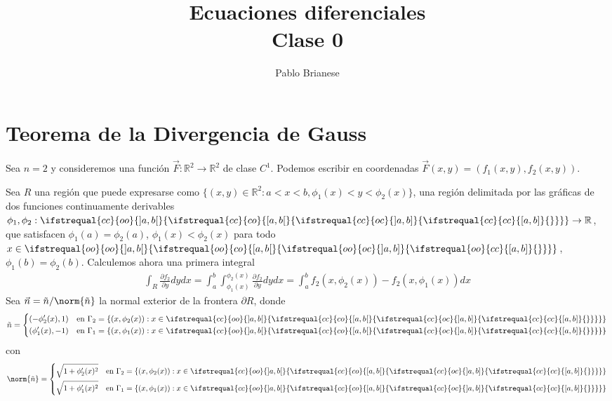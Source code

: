 \documentclass{report}
\title{Ecuaciones diferenciales \\ Clase 0}
\author{Pablo Brianese}
\newcommand{\realNumbers}{\mathbb{R}}
\theoremstyle{definition}
\theoremstyle{remark}
\newcommand{\leftOpenInterval}{\left]}
\newcommand{\rightOpenInterval}{\right[}
\newcommand{\leftClosedInterval}{\left[}
\newcommand{\rightClosedInterval}{\right]}
\newcommand{\interval}[3]{%
  \ifstrequal{#1}{oo}{%
    \leftOpenInterval #2, #3 \rightOpenInterval%
  }{%
    \ifstrequal{#1}{co}{%
      \leftClosedInterval #2, #3 \rightOpenInterval%
    }{%
      \ifstrequal{#1}{oc}{
        \leftOpenInterval #2, #3 \rightClosedInterval%
      }{%
        \ifstrequal{#1}{cc}{
          \leftClosedInterval #2, #3 \rightClosedInterval
        }{%
        }%
      }%
    }%
  }%
}
\begin{document}
  \maketitle

  \section{Teorema de la Divergencia de Gauss}

  Sea \(n = 2\) y consideremos una función \(\vec{F} : \realNumbers^2 \rightarrow \realNumbers^2\) de clase \(C^1\).
  Podemos escribir en coordenadas \(\vec{F}(x, y) = (f_1(x, y), f_2(x, y))\).
  
  Sea \(R\) una región que puede expresarse como \(\{(x, y) \in \realNumbers^2 :  a < x < b, \phi_1(x) < y < \phi_2(x)\}\), una región delimitada por las gráficas de dos funciones continuamente derivables \(\phi_1, \phi_2 : \interval{cc}{a}{b} \rightarrow \realNumbers\), que satisfacen \(\phi_1(a) = \phi_2(a)\), \(\phi_1(x) < \phi_2(x)\) para todo \(x \in \interval{oo}{a}{b}\), \(\phi_1(b) = \phi_2(b)\).
  Calculemos ahora una primera integral
  \begin{align}
    \int_R \frac{\partial f_2}{\partial y} dy dx
    =
    \int_a^b\int_{\phi_1(x)}^{\phi_2(x)} \frac{\partial f_2}{\partial y} dy dx
    =
    \int_a^b f_2(x, \phi_2(x)) - f_2(x, \phi_1(x)) dx
  \end{align}
  Sea \(\vec{n} = \tilde{n} / \norm{\tilde{n}}\) la normal exterior de la frontera \(\partial R\),
  donde
  \begin{align}
    \tilde{n}
    =
    \left\{
      \begin{aligned}
        (- \phi_2'(x), 1)
        && \text{en }
        \Gamma_2 = \{(x, \phi_2(x)) : x \in \interval{cc}{a}{b}\}
        \\
        (\phi_1'(x), - 1)
        && \text{en }
        \Gamma_1 = \{(x, \phi_1(x)) : x \in \interval{cc}{a}{b}\}
      \end{aligned}
    \right.
  \end{align}
  con
  \begin{align}
    \norm{\tilde{n}}
    =
    \left\{
      \begin{aligned}
        \sqrt{1 + \phi_2'(x)^2}
        && \text{en }
        \Gamma_2 = \{(x, \phi_2(x)) : x \in \interval{cc}{a}{b}\}
        \\
        \sqrt{1 + \phi_1'(x)^2}
        && \text{en }
        \Gamma_1 = \{(x, \phi_1(x)) : x \in \interval{cc}{a}{b}\}
      \end{aligned}
    \right.
  \end{align}
\end{document}
